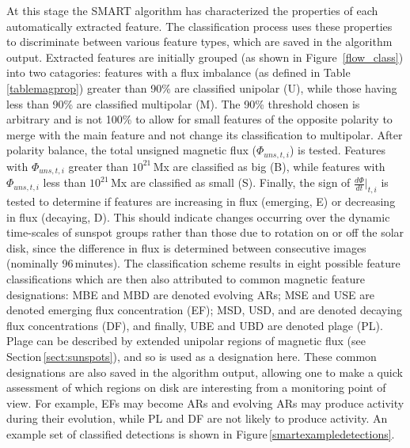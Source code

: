 At this stage the \gls{SMART} algorithm has characterized the properties of each automatically extracted feature. The classification process uses these properties to discriminate between various feature types, which are saved in the algorithm output. Extracted features are initially grouped (as shown in Figure~\ref{flow_class}) into two catagories: 
features with a flux imbalance (as defined in Table\,\ref{tablemagprop}) greater than 90\% are classified unipolar (U), while those having less than 90\% are classified multipolar (M). The 90\% threshold chosen is arbitrary and is not 100\% to allow for small features of the opposite polarity to merge with the main feature and not change its classification to multipolar. After polarity balance, the total unsigned magnetic flux ($\Phi_{uns,t,i}$) is tested. Features with $\Phi_{uns,t,i}$ greater than $10^{21}$\,Mx are classified as big (B), while features with $\Phi_{uns,t,i}$ less than $10^{21}$\,Mx are classified as small (S).
Finally, the sign of ${\frac{d\Phi}{dt}}|_{t,i}$ is tested to determine if features are increasing in flux (emerging, E) or decreasing in flux (decaying, D).  This should indicate changes occurring over the dynamic time-scales of sunspot groups rather than those due to rotation on or off the solar disk, since the difference in flux is determined between consecutive images (nominally 96\,minutes). The classification scheme results in eight possible feature classifications which are then also attributed to common magnetic feature designations: MBE and MBD are denoted evolving \glspl{AR}; MSE and USE are denoted emerging flux concentration (EF); MSD, USD, and are denoted decaying flux concentrations (DF), and finally, UBE and UBD are denoted plage (PL). Plage can be described by extended unipolar regions of magnetic flux (see Section\,\ref{sect:sunspots}), and so is used as a designation here. These common designations are also saved in the algorithm output, allowing one to make a quick assessment of which regions on disk are interesting from a monitoring point of view. For example, EFs may become \glspl{AR} and evolving \glspl{AR} may produce activity during their evolution, while PL and DF are not likely to produce activity. An example set of classified detections is shown in Figure\,\ref{smartexampledetections}.

